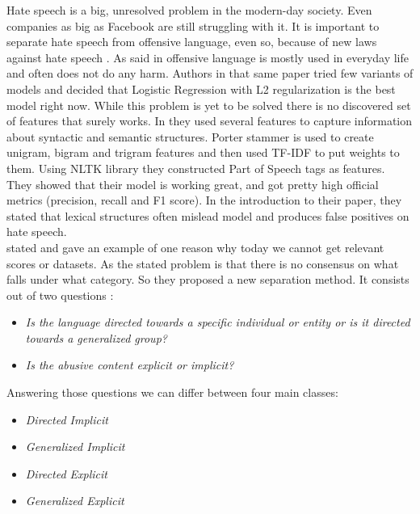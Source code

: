 \documentclass[10pt, a4paper]{article}
\begin{document}
	Hate speech is a big, unresolved problem in the modern-day society. Even companies as big as Facebook are still struggling with it. It is important to separate hate speech from offensive language, even so, because of new laws against hate speech \citep{Davidson2017AutomatedHS}. As said in \citet{Davidson2017AutomatedHS} offensive language is mostly used in everyday life and often does not do any harm. Authors in that same paper tried few variants of models and decided that Logistic Regression with L2 regularization is the best model right now.
	While this problem is yet to be solved there is no discovered set of features that surely works. In \citet{Davidson2017AutomatedHS} they used several features to capture information about syntactic and semantic structures. Porter stammer is used to create unigram, bigram and trigram features and then used TF-IDF to put weights to them. Using NLTK library they constructed Part of Speech tags as features. They showed that their model is working great, and got pretty high official metrics (precision, recall and F1 score). In the introduction to their paper, they stated that lexical structures often mislead model and produces false positives on hate speech. \citep{Davidson2017AutomatedHS}
	\\\citet{WaseemUnderstandingAbuse} stated and gave an example of one reason why today we cannot get relevant scores or datasets. As the stated problem is that there is no consensus on what falls under what category. So they proposed a new separation method. It consists out of two questions \citep{WaseemUnderstandingAbuse}:
	\begin{itemize}
		\item \textit{Is the language directed towards a specific individual or entity or is it directed towards a generalized group?}
		\item \textit{Is the abusive content explicit or implicit?}
	\end{itemize}
	Answering those questions we can differ between four main classes:
	\begin{itemize}
		\item \textit{Directed Implicit}
		\item \textit{Generalized Implicit}
		\item \textit{Directed Explicit}
		\item \textit{Generalized Explicit}
	\end{itemize}
	
\end{document}
